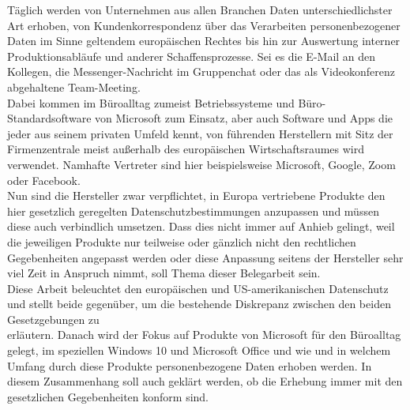 Täglich werden von Unternehmen aus allen Branchen Daten unterschiedlichster Art erhoben, von Kundenkorrespondenz über das Verarbeiten personenbezogener Daten im Sinne geltendem europäischen Rechtes bis hin zur Auswertung interner Produktionsabläufe und anderer Schaffensprozesse. Sei es die E-Mail an den Kollegen, die Messenger-Nachricht im Gruppenchat oder das als Videokonferenz abgehaltene Team-Meeting.\\
Dabei kommen im Büroalltag zumeist Betriebssysteme und Büro-Standardsoftware von Microsoft zum Einsatz, aber auch Software und Apps die jeder aus seinem privaten Umfeld kennt, von führenden Herstellern mit Sitz der Firmenzentrale meist außerhalb des europäischen Wirtschaftsraumes wird verwendet. Namhafte Vertreter sind hier beispielsweise Microsoft, Google, Zoom oder Facebook.\\
Nun sind die Hersteller zwar verpflichtet, in Europa vertriebene Produkte den hier gesetzlich geregelten Datenschutzbestimmungen anzupassen und müssen diese auch verbindlich umsetzen. Dass dies nicht immer auf Anhieb gelingt, weil die jeweiligen Produkte nur teilweise oder gänzlich nicht den rechtlichen Gegebenheiten angepasst werden oder diese Anpassung seitens der Hersteller sehr viel Zeit in Anspruch nimmt, soll Thema dieser Belegarbeit sein.\\
Diese Arbeit beleuchtet den europäischen und US-amerikanischen Datenschutz und stellt beide gegenüber, um die bestehende Diskrepanz zwischen den beiden Gesetzgebungen zu\\
erläutern. Danach wird der Fokus auf Produkte von Microsoft für den Büroalltag gelegt, im speziellen Windows 10 und Microsoft Office und wie und in welchem Umfang durch diese Produkte personenbezogene Daten erhoben werden. In diesem Zusammenhang soll auch geklärt werden, ob die Erhebung immer mit den gesetzlichen Gegebenheiten konform sind.